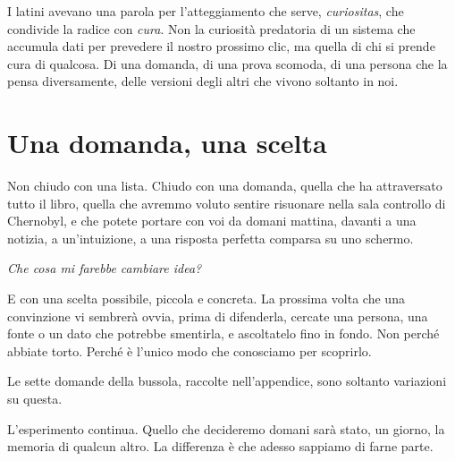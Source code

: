 I latini avevano una parola per l'atteggiamento che serve, \textit{curiositas}, che condivide la radice con \textit{cura}. Non la curiosità predatoria di un sistema che accumula dati per prevedere il nostro prossimo clic, ma quella di chi si prende cura di qualcosa. Di una domanda, di una prova scomoda, di una persona che la pensa diversamente, delle versioni degli altri che vivono soltanto in noi.

\section*{Una domanda, una scelta}

Non chiudo con una lista. Chiudo con una domanda, quella che ha attraversato tutto il libro, quella che avremmo voluto sentire risuonare nella sala controllo di Chernobyl, e che potete portare con voi da domani mattina, davanti a una notizia, a un'intuizione, a una risposta perfetta comparsa su uno schermo.

\begin{center}
\large\textit{Che cosa mi farebbe cambiare idea?}
\end{center}

E con una scelta possibile, piccola e concreta. La prossima volta che una convinzione vi sembrerà ovvia, prima di difenderla, cercate una persona, una fonte o un dato che potrebbe smentirla, e ascoltatelo fino in fondo. Non perché abbiate torto. Perché è l'unico modo che conosciamo per scoprirlo.

Le sette domande della bussola, raccolte nell'appendice, sono soltanto variazioni su questa.

L'esperimento continua. Quello che decideremo domani sarà stato, un giorno, la memoria di qualcun altro. La differenza è che adesso sappiamo di farne parte.

